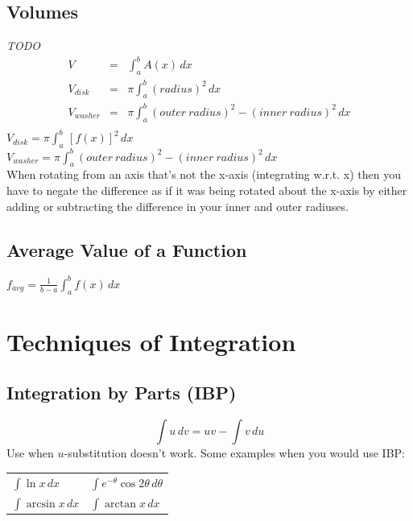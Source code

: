 \documentclass[8pt,letterpaper]{article}
\begin{document}
\subsection*{Volumes} %
\emph{TODO} \\
\begin{eqnarray*}
V &=& \int_a^b A(x) \, dx \\
V_{disk} &=& \pi \int_a^b (radius)^2 \, dx \\
V_{washer} &=& \pi \int_a^b (outer\:radius)^2 - (inner\:radius)^2 \, dx \\
\end{eqnarray*}
$V_{disk} = \pi \int_a^b \, [f(x)]^2 \, dx$ \\
$V_{washer} = \pi \int_a^b (outer\:radius)^2 - (inner\:radius)^2 \, dx$ \\

When rotating from an axis that's not the x-axis (integrating w.r.t. x)
then you have to negate the difference as if it was being rotated about the x-axis
by either adding or subtracting the difference in your inner and outer radiuses.

\subsection*{Average Value of a Function} %
$f_{avg} = \frac{1}{b-a} \int_a^b f(x) \, dx$

\section{Techniques of Integration} %

\subsection*{Integration by Parts (IBP)} %
\begin{equation}
\int u \, dv = uv - \int v \, du
\end{equation}
Use when $u$-substitution doesn't work.
Some examples when you would use IBP:
\begin{tabular}{l l}
$\int \ln x \, dx$ & $\int e^{-\theta} \cos 2\theta \, d\theta$ \\ 
$\int \arcsin x \, dx$ & $\int \arctan x \, dx$ \\ 
\end{tabular} 
\end{document}
